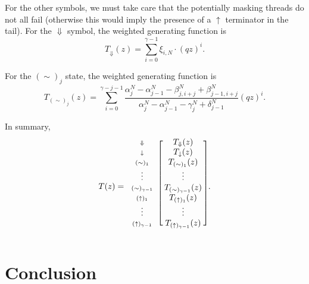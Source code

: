 \documentclass{article}
\newcommand{\DN}{\scriptstyle{\Downarrow}}
\newcommand{\dn}{\scriptstyle{\downarrow}}
\newcommand{\up}[1]{\scriptstyle{(\uparrow)_{#1}}}
\newcommand{\eq}[1]{\scriptstyle{(\sim)_{#1}}}
\begin{document}
For the other symbols, we must take care that the potentially masking
threads do not all fail (otherwise this would imply the presence of a
$\uparrow$ terminator in the tail). For the $\Downarrow$ symbol, the
weighted generating function is
\begin{equation}
T_{\Downarrow}(z) = \sum_{i=0}^{\gamma-1} \xi_{i,N} \cdot (qz)^i.
\end{equation}

For the $(\sim)_j$ state, the weighted generating function is
\begin{equation}
T_{(\sim)_j}(z) = \sum_{i=0}^{\gamma-j-1}
\frac{ \alpha_j^N-\alpha_{j-1}^N-\beta_{j,i+j}^N +\beta_{j-1,i+j}^N }
{\alpha_j^N-\alpha_{j-1}^N-\gamma_j^N+\delta_{j-1}^N} (qz)^i.
\end{equation}

In summary,
\begin{equation*}
T(z) = 
\begin{blockarray}{cc}
\begin{block}{c[c]}
\DN & T_\Downarrow(z) \\
\dn & T_\downarrow(z) \\
\eq{1} & T_{(\sim)_1}(z) \\
\vdots & \vdots \\
\eq{\gamma-1} & T_{(\sim)_{\gamma-1}}(z) \\
\up{1} & T_{(\uparrow)_1}(z) \\
\vdots & \vdots \\
\up{\gamma-1} & \; T_{(\uparrow)_{\gamma-1}}(z) \; \\
\end{block}
\end{blockarray}.
\end{equation*}


\section{Conclusion}
\end{document}
